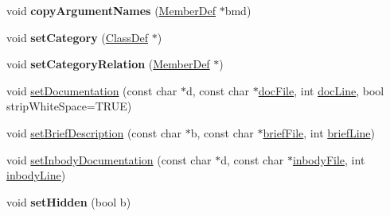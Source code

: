 \begin{DoxyCompactItemize}
\item 
\hypertarget{class_member_def_a7a2191f57cdd48f13329e7fcc548aa09}{void {\bfseries copy\-Argument\-Names} (\hyperlink{class_member_def}{Member\-Def} $\ast$bmd)}\label{class_member_def_a7a2191f57cdd48f13329e7fcc548aa09}

\item 
\hypertarget{class_member_def_a3c2f962d3a925484de8383145b823ca1}{void {\bfseries set\-Category} (\hyperlink{class_class_def}{Class\-Def} $\ast$)}\label{class_member_def_a3c2f962d3a925484de8383145b823ca1}

\item 
\hypertarget{class_member_def_abb8d2d80d5bb841f1ede6e665a5f9fbf}{void {\bfseries set\-Category\-Relation} (\hyperlink{class_member_def}{Member\-Def} $\ast$)}\label{class_member_def_abb8d2d80d5bb841f1ede6e665a5f9fbf}

\item 
void \hyperlink{class_member_def_a49660f42e3320c1022ef04edfbc7c850}{set\-Documentation} (const char $\ast$d, const char $\ast$\hyperlink{class_definition_afadeeb679bb7bda0ad5b4f358f0d33e2}{doc\-File}, int \hyperlink{class_definition_a3c2a6c87ac432d8a6db51bc52b2379da}{doc\-Line}, bool strip\-White\-Space=T\-R\-U\-E)
\item 
void \hyperlink{class_member_def_a98a2e802a5477e4ece9cd859cb07ec31}{set\-Brief\-Description} (const char $\ast$b, const char $\ast$\hyperlink{class_definition_a14b9cbdcc30535bcfd2e435667dea5fe}{brief\-File}, int \hyperlink{class_definition_aca87df70fcd505c2458a6ad75a1ede61}{brief\-Line})
\item 
void \hyperlink{class_member_def_a0ba4fab93cc2151a4c5c88279846f8fd}{set\-Inbody\-Documentation} (const char $\ast$d, const char $\ast$\hyperlink{class_definition_a69f697410a918873614549085444faa4}{inbody\-File}, int \hyperlink{class_definition_ae4b412e67989226ad3ce76f08f3ffaad}{inbody\-Line})
\item 
\hypertarget{class_member_def_a85f8b66f6d9e9acf89ae056554f82776}{void {\bfseries set\-Hidden} (bool b)}\label{class_member_def_a85f8b66f6d9e9acf89ae056554f82776}


\end{DoxyCompactItemize}

